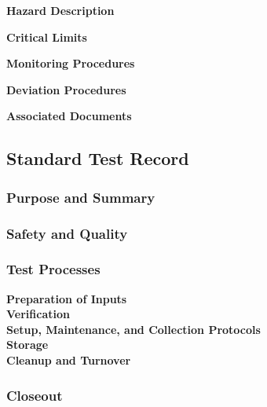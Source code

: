\textbf{Hazard Description}

\textbf{Critical Limits}

\textbf{Monitoring Procedures}

\textbf{Deviation Procedures}

\textbf{Associated Documents}


\subsection{Standard Test Record}

\subsubsection{Purpose and Summary}

\subsubsection{Safety and Quality}

\subsubsection{Test Processes}

\textbf{Preparation of Inputs}\\


\textbf{Verification}\\


\textbf{Setup, Maintenance, and Collection Protocols}\\


\textbf{Storage}\\


\textbf{Cleanup and Turnover}\\


\subsubsection{Closeout}

